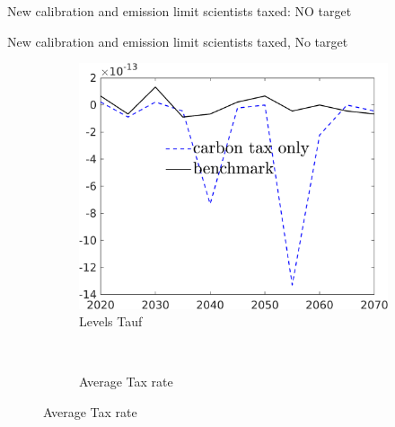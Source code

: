 \documentclass[11pt,aspectratio=169]{beamer}
\begin{document}
\begin{frame}{New calibration and emission limit scientists taxed: NO target}
\begin{figure}[h!!]
\begin{subfigure}{0.4\textwidth}
		\end{subfigure}
	\end{figure}
\end{frame}

\begin{frame}{New calibration and emission limit scientists taxed, No target}
	\begin{figure}[h!!]
		\centering
		\begin{subfigure}{0.4\textwidth}		
			\caption{{Levels  Tauf}}
			\includegraphics[width=1\textwidth]{../codding_model/own_basedOnFried/optimalPol_010922_revision/figures/all_13Sept22/NewCalib_pol_NoT_Tauf_emnet1_Sun2_spillover0_knspil3_xgr0_nsk0_sep0_extern0_PV1_etaa0.79_lgd1.png}
		\end{subfigure}
		\begin{minipage}[]{0.1\textwidth}
			\
		\end{minipage}
		\begin{subfigure}{0.4\textwidth}		
			\caption{{Average Tax rate}}

\end{subfigure}
\end{figure}
\end{frame}
\end{document}
